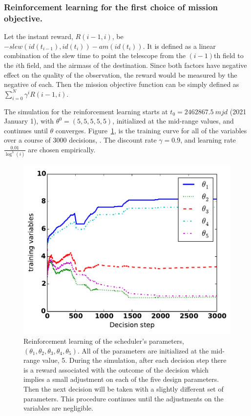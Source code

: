 \documentclass[12pt]{aastex62}
\theoremstyle{definition}
\begin{document}
\subsubsection{Reinforcement learning for the first choice of mission objective.} 
Let the instant reward, $R(i-1,i)$, be $-slew(id(t_{i-1}), id(t_{i})) - am(id(t_i))$. It is defined as a linear combination of the slew time to point the telescope from the $(i-1)$th field to the $i$th field, and the airmass of the destination. Since both factors have negative effect on the quality of the observation, the reward would be measured by the negative of each. Then the mission objective function can be simply defined as  $\sum_{i=0}^N \gamma^i R(i-1, i)$.

The simulation for the reinforcement learning starts at $t_0 = 2462867.5~mjd$ (2021 January 1), with $\theta^0 = (5,5,5,5,5)$, initialized at the mid-range values, and continues until $\theta$ converges. Figure~\ref{fig_theta_conv}, is the training curve for all of the variables over a course of 3000 decisions, . The discount rate $\gamma = 0.9$, and learning rate $\frac{0.01}{\log^3(i)}$ are chosen empirically. 

\begin{figure}[h!]
\begin{center}
\includegraphics[width=0.5\linewidth]{TDcurve.pdf}
\end{center}
\caption{Reinforcement learning of the scheduler's parameters, $(\theta_1,\theta_2,\theta_3,\theta_4,\theta_5)$. All of the parameters are initialized at the mid-range value, 5. During the simulation, after each decision step there is a reward associated with the outcome of the decision which implies a small adjustment on each of the five design parameters. Then the next decision will be taken with a slightly different set of parameters. This procedure continues until the adjustments on the variables are negligible.}
\label{fig_theta_conv}
\end{figure}
\end{document}
